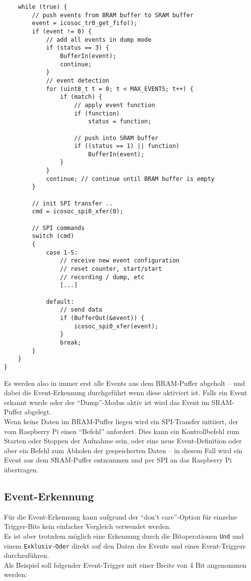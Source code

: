 {\begin{verbatim}
	while (true) {
		// push events from BRAM buffer to SRAM buffer 
		event = icosoc_tr0_get_fifo();
		if (event != 0) {
			// add all events in dump mode
			if (status == 3) {
				BufferIn(event);	
				continue;
			}
			// event detection
			for (uint8_t t = 0; t < MAX_EVENTS; t++) {
				if (match) {
					// apply event function
					if (function)
						status = function;
					
					// push into SRAM buffer
					if ((status == 1) || function)
						BufferIn(event);
				}	
			}
			continue; // continue until BRAM buffer is empty	
		}

		// init SPI transfer ..
		cmd = icosoc_spi0_xfer(0);
	
		// SPI commands	
		switch (cmd) 
		{
			case 1-5:
				// receive new event configuration
				// reset counter, start/start  
				// recording / dump, etc
				[...]
		
			default:
				// send data
				if (BufferOut(&event)) {
					icosoc_spi0_xfer(event);
				}		
				break;
		}
	}
}
\end{verbatim}

Es werden also in immer erst alle Events aus dem BRAM-Puffer abgeholt -- und dabei die Event-Erkennung durchgeführt wenn diese aktiviert ist. Falls ein Event erkannt wurde oder der ``Dump''-Modus aktiv ist wird das Event im SRAM-Puffer abgelegt.\\
Wenn keine Daten im BRAM-Puffer liegen wird ein SPI-Transfer initiiert, der vom Raspberry Pi einen ``Befehl'' anfordert. Dies kann ein Kontrollbefehl zum Starten oder Stoppen der Aufnahme sein, oder eine neue Event-Definition oder aber ein Befehl zum Abholen der gespeicherten Daten -- in diesem Fall wird ein Event aus dem SRAM-Puffer entnommen und per SPI an das Raspberry Pi übertragen. 

\subsection{Event-Erkennung}

Für die Event-Erkennung kann aufgrund der ``don't care''-Option für einzelne Trigger-Bits kein einfacher Vergleich verwendet werden.\\
Es ist aber trotzdem möglich eine Erkennung durch die Bitoperationen {\tt Und} und einem {\tt Exklusiv-Oder} direkt auf den Daten des Events und eines Event-Triggers durchzuführen.\\
Als Beispiel soll folgender Event-Trigger mit einer Breite von 4 Bit angenommen werden:

}
